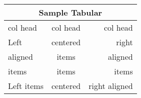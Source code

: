 \documentclass[a4paper,12pt,onecolumn]{article}
\begin{document}
\renewcommand{\arraystretch}{2.5}
\begin{tabular}{|l|c|r|}
  \hline
    \multicolumn{3}{|c|}{Sample Tabular}      \\
      \hline
        col head   & col head & col head      \\
      \hline 
        Left       & centered & right         \\
        \cline{1-2}

        aligned    & items    & aligned       \\
        \cline{2-3}
        items      & items    & items         \\
        \cline{1-2}
        Left items & centered & right aligned \\ 
      \hline
\end{tabular}
\end{document}
